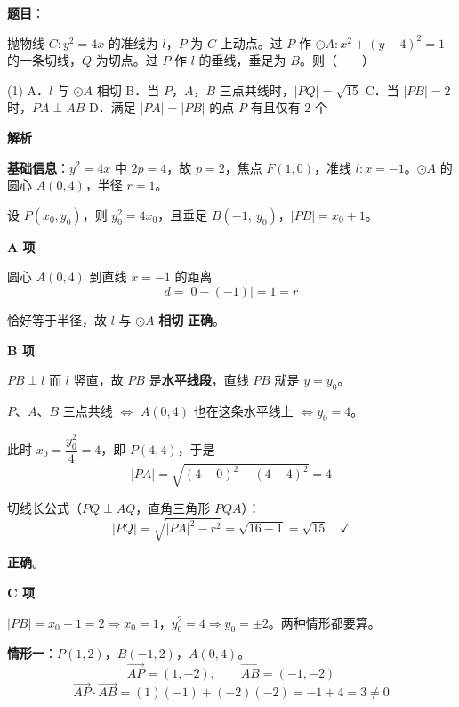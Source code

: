 \begin{answer}

\textbf{题目}：

抛物线 $C:y^{2}=4x$ 的准线为 $l$，$P$ 为 $C$ 上动点。过 $P$ 作 $\odot A:x^{2}+(y-4)^{2}=1$ 的一条切线，$Q$ 为切点。过 $P$ 作 $l$ 的垂线，垂足为 $B$。则\mbox{（　　）}

\begin{gkopts}(1)
\task A．$l$ 与 $\odot A$ 相切
\task B．当 $P$，$A$，$B$ 三点共线时，$|PQ|=\sqrt{15}$
\task C．当 $|PB|=2$ 时，$PA\perp AB$
\task D．满足 $|PA|=|PB|$ 的点 $P$ 有且仅有 $2$ 个
\end{gkopts}

\textbf{解析}

\textbf{基础信息}：$y^{2}=4x$ 中 $2p=4$，故 $p=2$，焦点 $F(1,0)$，准线 $l:x=-1$。$\odot A$ 的圆心 $A(0,4)$，半径 $r=1$。

设 $P\left(x_0,y_0\right)$，则 $y_0^{2}=4x_0$，且垂足 $B\left(-1,\ y_0\right)$，$|PB|=x_0+1$。

\par\medskip

\textbf{A 项}

圆心 $A(0,4)$ 到直线 $x=-1$ 的距离
\nopagebreak[4]
\[d=|0-(-1)|=1=r\]

恰好等于半径，故 $l$ 与 $\odot A$ \textbf{相切}  \textbf{正确}。

\par\medskip

\textbf{B 项}

$PB\perp l$ 而 $l$ 竖直，故 $PB$ 是\textbf{水平线段}，直线 $PB$ 就是 $y=y_0$。

$P$、$A$、$B$ 三点共线 $\iff$ $A(0,4)$ 也在这条水平线上 $\iff y_0=4$。

此时 $x_0=\dfrac{y_0^{2}}4=4$，即 $P(4,4)$，于是
\nopagebreak[4]
\[|PA|=\sqrt{(4-0)^{2}+(4-4)^{2}}=4\]

切线长公式（$PQ\perp AQ$，直角三角形 $PQA$）：
\nopagebreak[4]
\[|PQ|=\sqrt{|PA|^{2}-r^{2}}=\sqrt{16-1}=\sqrt{15}\quad\checkmark\]

 \textbf{正确}。

\par\medskip

\textbf{C 项}

$|PB|=x_0+1=2\Rightarrow x_0=1$，$y_0^{2}=4\Rightarrow y_0=\pm2$。两种情形都要算。

\textbf{情形一}：$P(1,2)$，$B(-1,2)$，$A(0,4)$。
\nopagebreak[4]
\[\overrightarrow{AP}=(1,-2),\qquad \overrightarrow{AB}=(-1,-2)\]
\nopagebreak[4]
\[\overrightarrow{AP}\cdot\overrightarrow{AB}=(1)(-1)+(-2)(-2)=-1+4=3\ne0\]


\end{answer}
